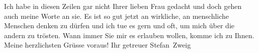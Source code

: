 \pstart
           Ich habe in diesen Zeilen gar nicht Ihrer lieben Frau gedacht und doch gehen auch meine Worte an sie. Es ist
               so gut jetzt an wirkliche, an menschliche Menschen denken zu dürfen und ich tue es
               gern und oft, um mich über die andern zu trösten. Wann immer Sie mir es erlauben
               wollen, komme ich zu Ihnen. Meine herzlichsten Grüsse voraus! Ihr getreuer\pend
           \pstart \spacefill\mbox{Stefan Zweig}\pend{}\endnumbering{}  \newcommand{\dateiname}{L03659}\newcommand{\titel}{Stefan Zweig an Arthur Schnitzler, 25. 9. 1916}\newcommand{\editorInnen}{Selma Jahnke und Martin Anton Müller}

